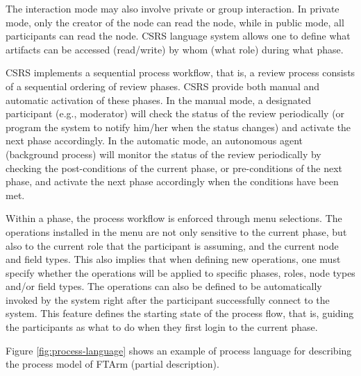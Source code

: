 The interaction mode may also involve private or group interaction. In
private mode, only the creator of the node can read the node, while in 
public mode, all participants can read the node. CSRS language system
allows one to define what artifacts can be accessed (read/write) by
whom (what role) during what phase.

CSRS implements a sequential process workflow, that is, a review process
consists of a sequential ordering of review phases.
CSRS provide both manual and automatic
activation of these phases. In the manual mode, a designated participant
(e.g., moderator) will check the status of the review periodically (or
program the system to notify him/her when the status changes) and activate
the next phase accordingly. In the automatic mode, an autonomous agent
(background process) will monitor the status of the review
periodically by checking the post-conditions of the current phase, or
pre-conditions of the next phase, and activate the next phase
accordingly when the conditions have been met.

Within a phase, the process workflow is enforced through menu
selections. The operations installed in the menu are
not only sensitive to the current phase, but also to the current role that
the participant is assuming, and the current node and field types.
This also implies that when defining new operations, one must specify
whether the operations will be applied to specific 
phases, roles, node types and/or field types. The operations can also
be defined to be automatically invoked by the
system right after the participant successfully connect to the system.
This feature defines the starting state of the process flow, that is,
guiding the participants as what to do when they first login to the
current phase. 

Figure \ref{fig:process-language} shows an example of process
language for describing the process model of FTArm (partial
description). 

